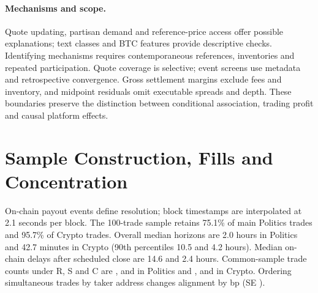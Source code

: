 \documentclass[sigconf,anonymous,nonacm,balance=false]{acmart}
\renewcommand{\topfraction}{0.90}
\renewcommand{\dbltopfraction}{0.90}
\renewcommand{\textfraction}{0.10}
\renewcommand{\floatpagefraction}{0.75}
\renewcommand{\dblfloatpagefraction}{0.75}
\begin{document}
\paragraph{Mechanisms and scope.}
Quote updating, partisan demand and reference-price access offer possible explanations; text classes and BTC features provide descriptive checks. Identifying mechanisms requires contemporaneous references, inventories and repeated participation. Quote coverage is selective; event screens use metadata and retrospective convergence. Gross settlement margins exclude fees and inventory, and midpoint residuals omit executable spreads and depth. These boundaries preserve the distinction between conditional association, trading profit and causal platform effects.

\label{paper:body_end}
\clearpage
\nobalance
{}\label{paper:references_start}


\appendix
\renewcommand{\floatpagefraction}{0.95}
\renewcommand{\dblfloatpagefraction}{0.95}
\renewcommand{\topfraction}{0.95}
\renewcommand{\dbltopfraction}{0.95}
\renewcommand{\textfraction}{0.05}
\setcounter{topnumber}{4}
\setcounter{bottomnumber}{4}
\setcounter{totalnumber}{8}
\setcounter{dbltopnumber}{4}
\renewcommand{\thetable}{S\arabic{table}}
\renewcommand{\thefigure}{S\arabic{figure}}
\renewcommand{\theHtable}{S\arabic{table}}
\renewcommand{\theHfigure}{S\arabic{figure}}
\setcounter{table}{0}
\setcounter{figure}{0}
\label{paper:appendix_start}

\section{Sample Construction, Fills and Concentration}
\label{app:defs}
On-chain payout events define resolution; block timestamps are interpolated at 2.1 seconds per block. The 100-trade sample retains 75.1\% of main Politics trades and 95.7\% of Crypto trades. Overall median horizons are 2.0 hours in Politics and 42.7 minutes in Crypto (90th percentiles 10.5 and 4.2 hours). Median on-chain delays after scheduled close are 14.6 and 2.4 hours. Common-sample trade counts under R, S and C are \PolNR, \PolNS{} and \PolNC{} in Politics and \CryNR, \CryNS{} and \CryNC{} in Crypto. Ordering simultaneous trades by taker address changes alignment by \OrdDiff{} bp (SE \OrdSE).

\begin{table}[!htbp]
\centering
\caption{Fill prices and actual share weights on the common H100 sample. The final column uses a share-weighted execution price. Probability bp.}
\label{tab:fill}

\end{table}
\begin{table}[!htbp]
\centering
\caption{Normalized covariance shifts on the common H100 sample. Market shift: per trade minus per market; order shift: per USD minus per trade. Probability bp.}
\label{tab:weight_shifts}

\end{table}
\end{document}
